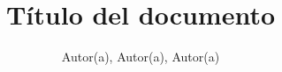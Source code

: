 \documentclass[stu, 12pt, letterpaper, donotrepeattitle, floatsintext]{apa7}
\title{\Large Título del documento}
\author{Autor(a), Autor(a), Autor(a)} %
\affiliation{Nombre de la institución}
\begin{document}
\maketitle


\tableofcontents
\setcounter{tocdepth}{2}
\newpage
\listoftables
\newpage
\listoffigures
\newpage
\lstlistoflistings
\newpage

\setcounter{page}{2}



\newpage
\renewcommand\refname{\large\textbf{Referencias Bibliográficas}}
\printbibliography
\end{document}
